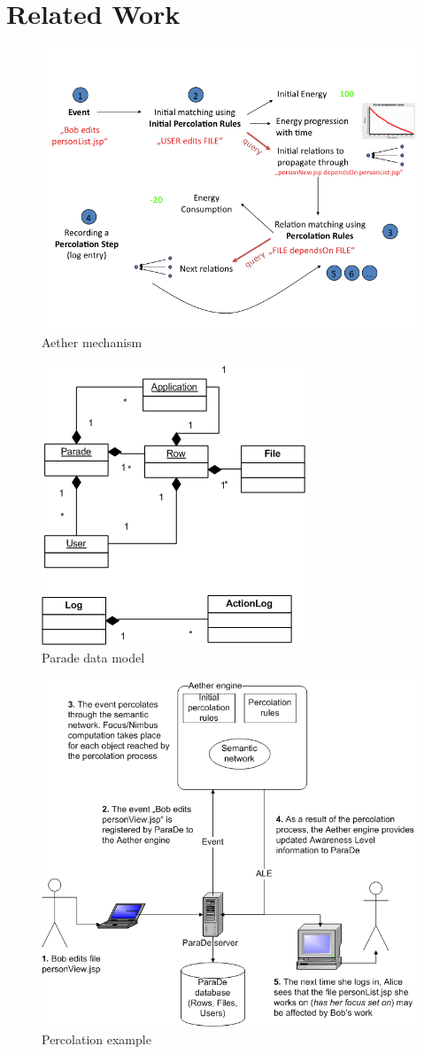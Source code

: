 \documentclass{ecscw2007}
\begin{document}
\section*{Related Work} 


\begin{figure}[thb]
  \centering
  \includegraphics[width=.7\linewidth]{aether-mechanism}
  \caption{Aether mechanism}
  \label{fig:aether-mechanism}
\end{figure}

\begin{figure}[thb]
  \centering
  \includegraphics[width=.4\linewidth]{parade-data-model}
  \caption{Parade data model}
  \label{fig:parade-data-model}
\end{figure}

\begin{figure}[thb]
  \centering
  \includegraphics[width=.7\linewidth]{peroclation-example}
  \caption{Percolation example}
  \label{fig:percolation}
\end{figure}
\end{document}

